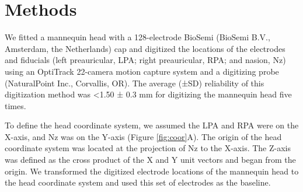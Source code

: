 \documentclass[../thesis_seyed.tex]{subfiles}
\begin{document}
\section{Methods}

We fitted a mannequin head with a 128-electrode BioSemi (BioSemi B.V., Amsterdam, the Netherlands) cap and digitized the locations of the electrodes and fiducials (left preauricular, LPA; right preauricular, RPA; and nasion, Nz) using an OptiTrack 22-camera motion capture system and a digitizing probe (NaturalPoint Inc., Corvallis, OR). The average (±SD) reliability of this digitization method was <1.50 ± 0.3 mm for digitizing the mannequin head five times.

To define the head coordinate system, we assumed the LPA and RPA were on the X-axis, and Nz was on the Y-axis (Figure \ref{fig:coor}A). The origin of the head coordinate system was located at the projection of Nz to the X-axis. The Z-axis was defined as the cross product of the X and Y unit vectors and began from the origin. We transformed the digitized electrode locations of the mannequin head to the head coordinate system and used this set of electrodes as the baseline.
\end{document}
